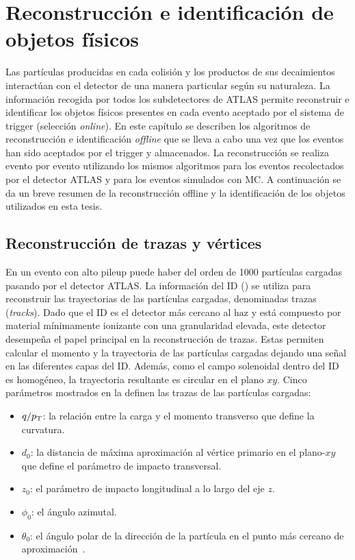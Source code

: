 \chapter{Reconstrucción e identificación de objetos físicos}
\label{ch:objects}


Las partículas producidas en cada colisión y los productos de sus decaimientos interactúan con el detector de una manera particular según su naturaleza. La información recogida por todos los subdetectores de \ac{ATLAS} permite reconstruir e identificar los objetos físicos presentes en cada evento aceptado por el sistema de trigger (selección \textit{online}). En este capítulo se describen los algoritmos de reconstrucción e identificación \textit{offline} que se lleva a cabo una vez que los eventos han sido aceptados por el trigger y almacenados. La reconstrucción se realiza evento por evento utilizando los mismos algoritmos para los eventos recolectados por el detector \ac{ATLAS} y para los eventos simulados con \acf{MC}. A continuación se da un breve resumen de la reconstrucción offline y la identificación de los objetos utilizados en esta tesis.




\section{Reconstrucción de trazas y vértices}

En un evento con alto pileup puede haber del orden de 1000 partículas cargadas pasando por el detector \ac{ATLAS}. La información del \ac{ID} (\Sect{\ref{subsec:atlas:atlas:id}}) se utiliza para reconstruir las trayectorias de las partículas cargadas, denominadas trazas (\textit{tracks}).
Dado que el \ac{ID} es el detector más cercano al haz y está compuesto por material mínimamente ionizante con una granularidad elevada, este detector desempeña el papel principal en la reconstrucción de trazas. Estas permiten calcular el momento y la trayectoria de las partículas cargadas dejando una señal en las diferentes capas del \ac{ID}. Además, como el campo solenoidal dentro del \ac{ID} es homogéneo, la trayectoria resultante es circular en el plano \(xy\). Cinco parámetros mostrados en la \Fig{\ref{fig:objects:track_vtx:track_parameters}} definen las trazas de las partículas cargadas:
\begin{itemize}
    \item \(q/p_{\text{T}}\): la relación entre la carga y el momento transverso que define la curvatura.
    \item \(d_0\): la distancia de máxima aproximación al vértice primario en el plano-\(xy\) que define el parámetro de impacto transversal.
    \item \(z_0\): el parámetro de impacto longitudinal a lo largo del eje \(z\).
    \item \(\phi_0\): el ángulo azimutal.
    \item \(\theta_0\): el ángulo polar de la dirección de la partícula en el punto más cercano de aproximación~\cite{ATLAS-Tracks-Performance-Run2}.
\end{itemize}

